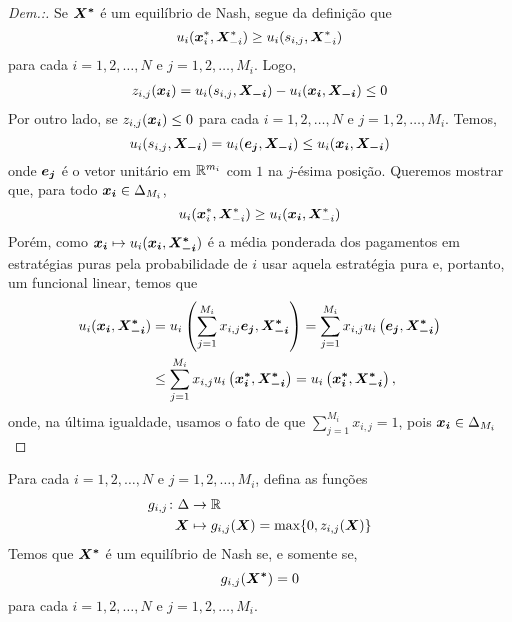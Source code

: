 \begin{proof}[Dem.:]
    Se $\boldsymbol{X^*}$ é um equilíbrio de Nash, segue da definição que
    \begin{equation}
        u_i(\boldsymbol{x}^*_i,\boldsymbol{X}^*_{-i})\geq u_i(s_{i,j},\boldsymbol{X}^*_{-i})
    \end{equation}
    para cada $i=1,2,\dots,N$ e $j=1,2,\dots,M_i$. Logo,
    \begin{multline}
        z_{i,j}(\boldsymbol{x_i})=u_i(s_{i,j},\boldsymbol{X_{-i}})-u_i(\boldsymbol{x_i},\boldsymbol{X_{-i}})\leq 0
    \end{multline}
    Por outro lado, se $z_{i,j}(\boldsymbol{x_i})\leq 0$ para cada $i=1,2,\dots,N$ e $j=1,2,\dots,M_i$. Temos,
    \begin{equation}
        u_i(s_{i,j},\boldsymbol{X_{-i}})=u_i(\boldsymbol{e_j},\boldsymbol{X_{-i}})\leq u_i(\boldsymbol{x_i},\boldsymbol{X_{-i}})
    \end{equation}
    onde $\boldsymbol{e_j}$ é o vetor unitário em $\mathbb{R}^{m_i}$ com $1$ na $j$-ésima posição. Queremos mostrar que, para todo $\boldsymbol{x_i}\in\Delta_{M_i}$,
    \begin{equation}
        u_i(\boldsymbol{x}^*_i,\boldsymbol{X}^*_{-i})\geq u_i(\boldsymbol{x_i},\boldsymbol{X}^*_{-i})
    \end{equation}
    Porém, como $\boldsymbol{x_i}\mapsto u_i(\boldsymbol{x_i},\boldsymbol{X^*_{-i}})$ é a média ponderada dos pagamentos em estratégias puras pela probabilidade de $i$ usar aquela estratégia pura e, portanto, um funcional linear, temos que
    \begin{equation}
    \begin{split}
        u_i(\boldsymbol{x_i},\boldsymbol{X^*_{-i}}) &= u_i\left(\sum_{j=1}^{M_i}x_{i,j}\boldsymbol{e_j},\boldsymbol{X^*_{-i}}\right)
        = \sum_{j=1}^{M_i}x_{i,j}u_i\left(\boldsymbol{e_j},\boldsymbol{X^*_{-i}}\right) \\
        & \leq\sum_{j=1}^{M_i}x_{i,j}u_i\left(\boldsymbol{x_i^*},\boldsymbol{X^*_{-i}}\right)
        = u_i\left(\boldsymbol{x_i^*},\boldsymbol{X^*_{-i}}\right),
    \end{split}
    \end{equation}
    onde, na última igualdade, usamos o fato de que  $\sum_{j=1}^{M_i}x_{i,j}=1$, pois $\boldsymbol{x_i}\in\Delta_{M_i}$
\end{proof}

\raggedbottom %

\begin{theorem}
    Para cada $i=1,2,\dots,N$ e $j=1,2,\dots,M_i$, defina as funções
    \begin{align*}
        \begin{split}
            g_{i,j} \colon \Delta &\to \mathbb{R}\\
            \boldsymbol{X} &\mapsto g_{i,j}(\boldsymbol{X})=\textup{max}\{0,z_{i,j}(\boldsymbol{X})\}
        \end{split}
    \end{align*}
    Temos que $\boldsymbol{X^*}$ é um equilíbrio de Nash se, e somente se,
    \begin{equation*}
        g_{i,j}(\boldsymbol{X^*})= 0
    \end{equation*}
    para cada $i=1,2,\dots,N$ e $j=1,2,\dots,M_i$.
\end{theorem}

